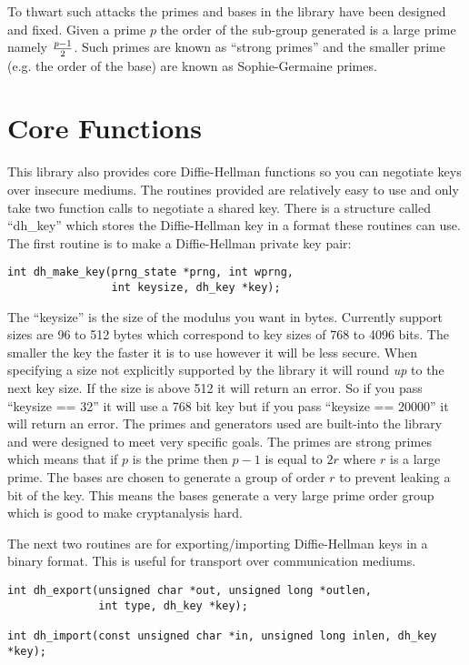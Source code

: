 \documentclass[synpaper]{book}
\begin{document}
To thwart such attacks the primes and bases in the library have been designed and fixed.  Given a prime $p$ the order of
 the sub-group generated is a large prime namely ${p - 1} \over 2$.  Such primes are known as ``strong primes'' and the 
smaller prime (e.g. the order of the base) are known as Sophie-Germaine primes.

\section{Core Functions}

This library also provides core Diffie-Hellman functions so you can negotiate keys over insecure mediums.  The routines 
provided are relatively easy to use and only take two function calls to negotiate a shared key.  There is a structure
called ``dh\_key'' which stores the Diffie-Hellman key in a format these routines can use.  The first routine is to
make a Diffie-Hellman private key pair:
\begin{verbatim}
int dh_make_key(prng_state *prng, int wprng, 
                int keysize, dh_key *key);
\end{verbatim}
The ``keysize'' is the size of the modulus you want in bytes.  Currently support sizes are 96 to 512 bytes which correspond 
to key sizes of 768 to 4096 bits. The smaller the key the faster it is to use however it will be less secure.  When 
specifying a size not explicitly supported by the library it will round {\em up} to the next key size.  If the size is 
above 512 it will return an error.  So if you pass ``keysize == 32'' it will use a 768 bit key but if you pass 
``keysize == 20000'' it will return an error.  The primes and generators used are built-into the library and were designed 
to meet very specific goals.  The primes are strong primes which means that if $p$ is the prime then
$p-1$ is equal to $2r$ where $r$ is a large prime.  The bases are chosen to generate a group of order $r$ to prevent
leaking a bit of the key.  This means the bases generate a very large prime order group which is good to make cryptanalysis
hard.

The next two routines are for exporting/importing Diffie-Hellman keys in a binary format.  This is useful for transport
over communication mediums.  

 
\begin{verbatim}
int dh_export(unsigned char *out, unsigned long *outlen, 
              int type, dh_key *key);

int dh_import(const unsigned char *in, unsigned long inlen, dh_key *key);
\end{verbatim}
\end{document}
